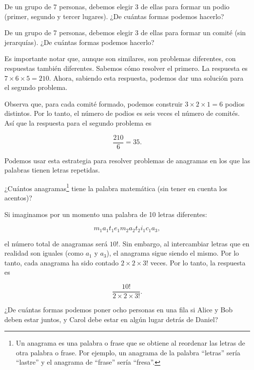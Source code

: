 \documentclass[11pt]{scrartcl}
\begin{document}
\begin{claim}[Situación 1]
De un grupo de 7 personas, debemos elegir 3 de ellas para formar un podio (primer, segundo y tercer lugares). ¿De cuántas formas podemos hacerlo?
\end{claim}

\begin{claim}[Situación 2]
    De un grupo de 7 personas, debemos elegir 3 de ellas para formar un comité (sin jerarquías). ¿De cuántas formas podemos hacerlo?
\end{claim}

Es importante notar que, aunque son similares, son problemas diferentes, con respuestas también diferentes. Sabemos cómo resolver el primero. La respuesta es $7 \times 6 \times 5 = 210$. Ahora, sabiendo esta respuesta, podemos dar una solución para el segundo problema.

Observa que, para cada comité formado, podemos construir $3 \times 2 \times 1 = 6$ podios distintos. Por lo tanto, el número de podios es seis veces el número de comités. Así que la respuesta para el segundo problema es

\[
\frac{210}{6} = 35.
\]

Podemos usar esta estrategia para resolver problemas de anagramas en los que las palabras tienen letras repetidas.

\begin{example}
¿Cuántos anagramas\footnote[1]{Un anagrama es una palabra o frase que se obtiene al reordenar las letras de otra palabra o frase. Por ejemplo, un anagrama de la palabra ``letras'' sería ``lastre'' y el anagrama de ``frase'' sería ``fresa''.} tiene la palabra matemática (sin tener en cuenta los acentos)?
\end{example}

Si imaginamos por un momento una palabra de 10 letras diferentes:

\[
m_1a_1t_1e_1m_2a_2t_2i_1c_1a_3,
\]

el número total de anagramas será $10!$. Sin embargo, al intercambiar letras que en realidad son iguales (como $a_1$ y $a_3$), el anagrama sigue siendo el mismo. Por lo tanto, cada anagrama ha sido contado $2 \times 2 \times 3!$ veces. Por lo tanto, la respuesta es

\[
\frac{10!}{2 \times 2 \times 3!}.
\]

\begin{example}
¿De cuántas formas podemos poner ocho personas en una fila si Alice y Bob deben estar juntos, y Carol debe estar en algún lugar detrás de Daniel?
\end{example}
\end{document}
